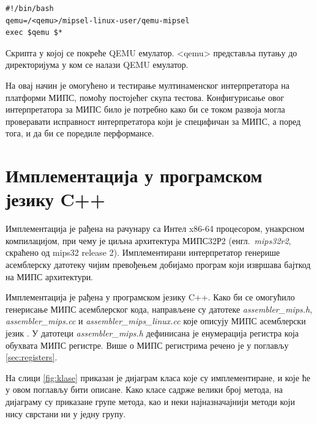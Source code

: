 \documentclass[12pt,oneside]{memoir}
\begin{document}
\begin{listing}
\centering
\begin{verbatim}
#!/bin/bash
qemu=/<qemu>/mipsel-linux-user/qemu-mipsel
exec $qemu $*
\end{verbatim}
\caption{Скрипта у којој се покреће QEMU емулатор. <qemu> представља путању до директоријума у ком се налази QEMU емулатор.}
\label{skripta}
\end{listing}

На овај начин је омогућено и тестирање мултинаменског интерпретатора на платформи МИПС, помоћу постојећег скупа тестова. Конфигурисање овог интерпретатора за МИПС било је потребно како би се током развоја могла проверавати исправност интерпретатора који је специфичан за МИПС, а поред тога, и да би се поредиле перформансе.

\section{Имплементација у програмском језику C++}
\label{implementacijacpp}
Имплементација је рађена на рачунару са Интел x86-64 процесором, унакрсном компилацијом, при чему је циљна архитектура  МИПС32Р2 (енгл.~\textit{mips32r2}, скраћено од mips32 release 2). Имплементирани интерпретатор генерише асемблерску датотеку чијим превођењем добијамо програм који извршава бајткод на МИПС архитектури.

Имплементација је рађена у програмском језику C++. Како би се омогућило генерисање МИПС асемблерског кода, направљене су датотеке \textit{assembler\_mips.h},  \textit{assembler\_mips.cc} и \textit{assembler\_mips\_linux.cc} које описују МИПС асемблерски језик \cite{assemblerMips2, assemblerMips1, assemblerMips3}. У датотеци \textit{assembler\_mips.h} дефинисана је енумерација регистра која обухвата МИПС регистре. Више о МИПС регистрима речено је у поглављу \ref{sec:registers}. 

На слици \ref{fig:klase} приказан је дијаграм класа које су имплементиране, и које ће у овом поглављу бити описане. Како класе садрже велики број метода, на дијаграму су приказане групе метода, као и неки најназначајнији методи који нису сврстани ни у једну групу.
\end{document}
